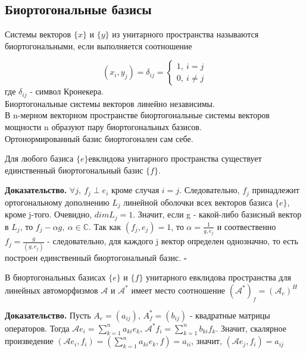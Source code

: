 \subsection{Биортогональные базисы}
\begin{defin}
Системы векторов $\{x\}$ и $\{y\}$ из унитарного пространства называются 
биортогональными, если выполняется соотношение
\end{defin}
$$(x_i,y_j)=\delta_{ij}=\begin{cases}1,~i=j\\0,~i\ne j\end{cases}$$где
$\delta_{ij}$ - символ Кронекера.\\
Биортогональные системы векторов линейно независимы. \\
В n-мерном векторном пространстве биортогональные системы векторов мощности
n образуют пару биортогональных базисов. \\
Ортонормированный базис биортогонален сам себе.
\begin{theor}
Для любого базиса $\{e\} $евклидова унитарного пространства существует 
единственный биортогональный базис $\{f\}$. 
\end{theor}
\textbf{Доказательство.} $\forall j,~f_j\perp e_i$ кроме случая $i=j$. 
Следовательно, $f_j$ принадлежит ортогональному дополнению $L_j$ линейной 
оболочки всех векторов базиса $\{e\}$, кроме j-того. Очевидно, $dimL_j=1$. 
Значит, если g - какой-либо базисный вектор в $L_j$, то $f_j-\alpha g,~
\alpha\in\mathbb C$. Так как $(f_j,e_j)=1$, то $\alpha=\frac1{g,e_j}$ и 
соотвественно $f_j=\frac g{(g,e_j)}$ - следовательно, для каждого j вектор 
определен однозначно, то есть построен единственный биортогональный базис.
$\square$
\begin{theor}\label{vparebiortba}
В биортогональных базисах $\{e\}$ и $\{f\}$ унитарного евклидова пространства
для линейных автоморфизмов $\mathcal A$ и $\mathcal A^*$ имеет место 
соотношение $(\mathcal A^*)_f=(\mathcal A_e)^H$
\end{theor}
\textbf{Доказательство.} Пусть $A_e=(a_{ij})$, $A^*_f=(b_{ij})$ - квадратные
матрицы операторов. Тогда $\mathcal Ae_i=\sum\limits^n_{k=1}a_{ki}e_k$,
$\mathcal A^*f_i=\sum\limits^n_{k=1}b_{ki}f_k$. Значит, скалярное
произведение $(\mathcal Ae_i,f_i)=(\sum\limits^n_{k=1}a_{ki}e_k,f)=a_{ii}$,
значит, $(\mathcal Ae_j,f_i)=a_{ij}$

